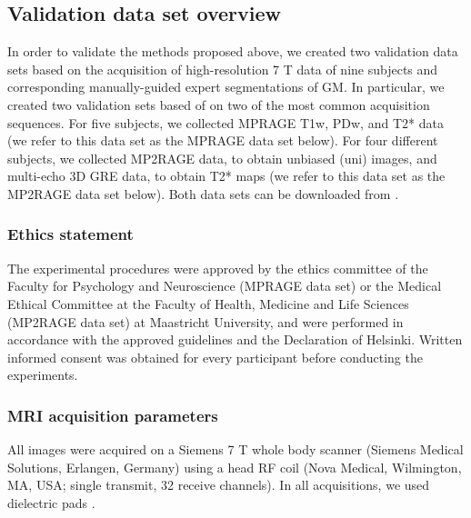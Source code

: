 \subsection{Validation data set overview}
In order to validate the methods proposed above, we created two validation data sets based on the acquisition of high-resolution 7 T data of nine subjects and corresponding manually-guided expert segmentations of GM. In particular, we created two validation sets based of on two of the most common acquisition sequences. For five subjects, we collected MPRAGE T1w, PDw, and T2* data (we refer to this data set as the MPRAGE data set below). For four different subjects, we collected MP2RAGE data, to obtain unbiased (uni) images, and multi-echo 3D GRE data, to obtain T2* maps (we refer to this data set as the MP2RAGE data set below). Both data sets can be downloaded from \cite{shared_dataset}.

\subsubsection{Ethics statement}
The experimental procedures were approved by the ethics committee of the Faculty for Psychology and Neuroscience (MPRAGE data set) or the Medical Ethical Committee at the Faculty of Health, Medicine and Life Sciences (MP2RAGE data set) at Maastricht University, and were performed in accordance with the approved guidelines and the Declaration of Helsinki. Written informed consent was obtained for every participant before conducting the experiments.

\subsubsection{MRI acquisition parameters}
All images were acquired on a Siemens 7 T whole body scanner (Siemens Medical Solutions, Erlangen, Germany) using a head RF coil (Nova Medical, Wilmington, MA, USA; single transmit, 32 receive channels). In all acquisitions, we used dielectric pads \cite{Teeuwisse2012}.

